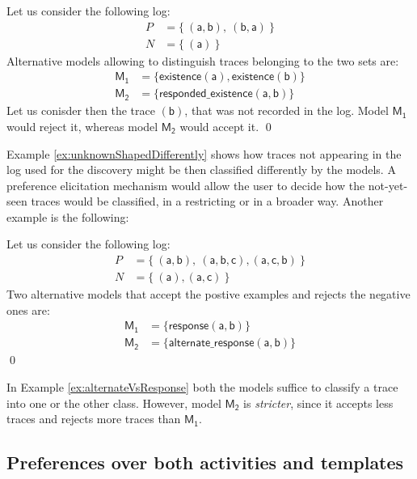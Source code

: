 \begin{example}
\label{ex:unknownShapedDifferently}
Let us consider the following log:
\begin{align*}
P & = \{\ (\mathsf{a}, \mathsf{b}),\ (\mathsf{b}, \mathsf{a})\ \} \\
N & = \{\ (\mathsf{a})\ \}
\end{align*}
%
Alternative models allowing to distinguish traces belonging to the two sets are:
\begin{align*}
\mathsf{M_1} & = \{ \mathsf{existence(a),existence(b)}\} \\
\mathsf{M_2} & = \{ \mathsf{responded\_existence(a, b)}\}
\end{align*}
%
Let us conisder then the trace $\mathsf{(b)}$, that was not recorded in the log. Model $\mathsf{M_1}$ would reject it, whereas model $\mathsf{M_2}$ would accept it.
\qed
\end{example}

Example \ref{ex:unknownShapedDifferently} shows how traces not appearing in the log used for the discovery might be then classified differently by the models. A preference elicitation mechanism would allow the user to decide how the not-yet-seen traces would be classified, in a restricting or in a broader way. Another example is the following:

\begin{example}
\label{ex:alternateVsResponse}
Let us consider the following log:
\begin{align*}
P & = \{\ (\mathsf{a}, \mathsf{b}),\ (\mathsf{a}, \mathsf{b}, \mathsf{c}),(\mathsf{a}, \mathsf{c}, \mathsf{b})\ \} \\
N & = \{\ (\mathsf{a}), (\mathsf{a}, \mathsf{c})\ \}
\end{align*}
%
Two alternative models that accept the postive examples and rejects the negative ones are:
\begin{align*}
\mathsf{M_1} & = \{ \mathsf{response(a,b)}\} \\
\mathsf{M_2} & = \{ \mathsf{alternate\_response(a, b)}\}
\end{align*}
\qed
\end{example}

In Example \ref{ex:alternateVsResponse} both the models suffice to classify a trace into one or the other class. However, model $\mathsf{M_2}$ is \emph{stricter}, since it accepts less traces and rejects more traces than $\mathsf{M_1}$.


\subsection{Preferences over both activities and templates}

